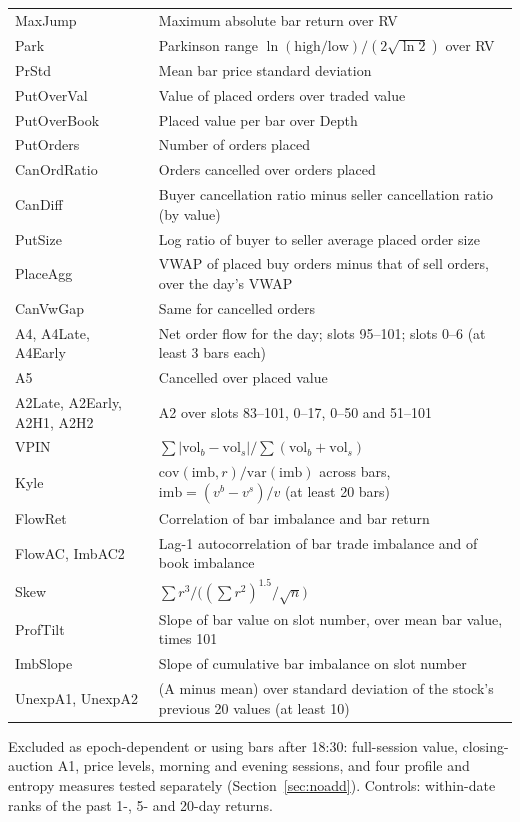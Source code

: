 \begin{longtable}{@{}R{3.0cm}p{12.6cm}@{}}
MaxJump & Maximum absolute bar return over RV \\
Park & Parkinson range $\ln(\text{high}/\text{low})/(2\sqrt{\ln 2})$ over RV \\
PrStd & Mean bar price standard deviation \\
PutOverVal & Value of placed orders over traded value \\
PutOverBook & Placed value per bar over Depth \\
PutOrders & Number of orders placed \\
CanOrdRatio & Orders cancelled over orders placed \\
CanDiff & Buyer cancellation ratio minus seller cancellation ratio (by value) \\
PutSize & Log ratio of buyer to seller average placed order size \\
PlaceAgg & VWAP of placed buy orders minus that of sell orders, over the day's VWAP \\
CanVwGap & Same for cancelled orders \\
A4, A4Late, A4Early & Net order flow for the day; slots 95--101; slots 0--6 (at least 3 bars each) \\
A5 & Cancelled over placed value \\
A2Late, A2Early, A2H1, A2H2 & A2 over slots 83--101, 0--17, 0--50 and 51--101 \\
VPIN & $\sum|\text{vol}_b-\text{vol}_s|/\sum(\text{vol}_b+\text{vol}_s)$ \\
Kyle & $\mathrm{cov}(\text{imb},r)/\mathrm{var}(\text{imb})$ across bars, $\text{imb}=(v^b-v^s)/v$ (at least 20 bars) \\
FlowRet & Correlation of bar imbalance and bar return \\
FlowAC, ImbAC2 & Lag-1 autocorrelation of bar trade imbalance and of book imbalance \\
Skew & $\sum r^3/\big((\sum r^2)^{1.5}/\sqrt n\big)$ \\
ProfTilt & Slope of bar value on slot number, over mean bar value, times 101 \\
ImbSlope & Slope of cumulative bar imbalance on slot number \\
UnexpA1, UnexpA2 & (A minus mean) over standard deviation of the stock's previous 20 values (at least 10) \\
\end{longtable}
\normalsize

Excluded as epoch-dependent or using bars after 18:30: full-session value, closing-auction A1, price levels, morning and evening sessions, and four profile and entropy measures tested separately (Section~\ref{sec:noadd}). Controls: within-date ranks of the past 1-, 5- and 20-day returns.

